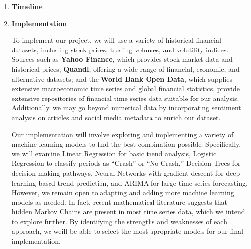 \documentclass[12pt, letterpaper]{article}
\begin{document}
\begin{enumerate}[label=]
    \item \textbf{Timeline}
        
        
    \item \textbf{Implementation} %

    


To implement our project, we will use a variety of historical financial datasets, including stock prices, trading volumes, and volatility indices. Sources such as \textbf{Yahoo Finance}, which provides stock market data and historical prices; \textbf{Quandl}, offering a wide range of financial, economic, and alternative datasets; and the \textbf{World Bank Open Data}, which supplies extensive macroeconomic time series and global financial statistics, provide extensive repositories of financial time series data suitable for our analysis. Additionally, we may go beyond numerical data by incorporating sentiment analysis on articles and social media metadata to enrich our dataset.

Our implementation will involve exploring and implementing a variety of machine learning models to find the best combination possible. Specifically, we will examine Linear Regression for basic trend analysis, Logistic Regression to classify periods as “Crash” or “No Crash,” Decision Trees for decision-making pathways, Neural Networks with gradient descent for deep learning-based trend prediction, and ARIMA for large time series forecasting. However, we remain open to adapting and adding more machine learning models as needed. In fact, recent mathematical literature suggests that hidden Markov Chains are present in most time series data, which we intend to explore further. By identifying the strengths and weaknesses of each approach, we weill be able to select the most apropriate models for our final implementation.


\end{enumerate}
\end{document}
